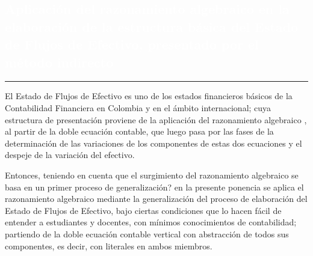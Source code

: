 \begin{titlepage}
\pagecolor{white}
\newcommand{\R}{\ensuremath{\mathbb{R}}}
\BgThispage
{}
\vspace*{-1.1cm}
\noindent
\def\titulo#1{\section{#1}}

\section{\bf\large\textcolor{white}{Aplicaci\'on del razonamiento algebraico en la elaboraci\'on de la estructura b\'asica del Estado de Flujos de Efectivo, presentado por el m\'etodo indirecto}}
\vspace*{2cm}\par
\noindent

\begin{minipage}{0.5\linewidth}
\begin{minipage}{0.45\linewidth}
    \begin{flushright}
        \printauthor
    \end{flushright}
\end{minipage} \hspace{-3pt}
%
\begin{minipage}{0.02\linewidth}
   \color{ptctitle} \rule{1pt}{245pt}
\end{minipage} 
\end{minipage}
\hspace*{-4.5cm}
\begin{minipage}{0.85\linewidth}
\begin{minipage}{0.85\linewidth}
\footnotesize
\vspace{5pt}
    \begin{resumen}
    
El Estado de Flujos de Efectivo es uno de los estados financieros b\'asicos de la Contabilidad Financiera en Colombia y en el \'ambito internacional; cuya estructura de presentaci\'on proviene de la aplicaci\'on del razonamiento algebraico ,   al partir de la doble ecuaci\'on contable, que luego  pasa por las fases de la determinaci\'on de las variaciones de los componentes de estas dos ecuaciones y el despeje de la variaci\'on del efectivo.

Entonces, teniendo en cuenta que \textquestiondown el surgimiento del razonamiento algebraico se basa en un primer proceso de generalizaci\'on?  en la presente ponencia se aplica el razonamiento algebraico mediante la generalizaci\'on  del proceso de elaboraci\'on del Estado de Flujos de Efectivo, bajo ciertas condiciones que lo hacen f\'acil de entender a estudiantes y docentes, con m\'inimos conocimientos de contabilidad; partiendo de  la doble ecuaci\'on contable vertical con abstracci\'on de todos sus componentes, es decir, con literales en ambos miembros. 


\end{resumen}
\end{minipage}
\end{minipage}
\end{titlepage}
